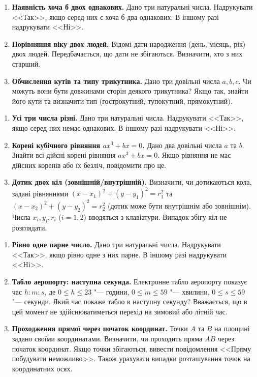 	
	
	
	{\large
		\begin{enumerate}
			\item \textbf{Наявність хоча б двох однакових.} Дано три натуральні числа. Надрукувати <<Так>>, якщо серед них є хоча б два однакових. В іншому разі надрукувати <<Ні>>.
			\item \textbf{Порівняння віку двох людей.} Відомі дати народження (день, місяць, рік) двох людей. Передбачається, що дати не збігаються. Визначити, хто з них старший.
			\item \textbf{Обчислення кутів та типу трикутника.} Дано три довільні числа $a, b, c$. Чи можуть вони бути довжинами сторін деякого трикутника? Якщо так, знайти його кути та визначити тип (гострокутний, тупокутний, прямокутний).
		\end{enumerate}
	}
	
	\vspace{2cm}
	
	{\large
		\begin{enumerate}
			\item \textbf{Усі три числа різні.} Дано три натуральні числа. Надрукувати <<Так>>, якщо серед них немає однакових. В іншому разі надрукувати <<Ні>>.
			\item \textbf{Корені кубічного рівняння $ax^3+bx=0$.} Дано два довільні числа $a$ та $b$. Знайти всі дійсні корені рівняння $ax^3 + bx = 0$. Якщо рівняння не має дійсних коренів або їх безліч, повідомити про це.
			\item \textbf{Дотик двох кіл (зовнішній/внутрішній).} Визначити, чи дотикаються кола, задані рівняннями $(x - x_1)^2 + (y - y_1)^2 = r_1^2$ та $(x - x_2)^2 + (y - y_2)^2 = r_2^2$ (дотик може бути внутрішнім або зовнішнім). Числа $x_i, y_i, r_i$ ($i = 1, 2$) вводяться з клавіатури. Випадок збігу кіл не розглядати.
		\end{enumerate}
	}
	

	
	
	{\large
		\begin{enumerate}
			\item \textbf{Рівно одне парне число.} Дано три натуральні числа. Надрукувати <<Так>>, якщо рівно одне з них парне. В іншому разі надрукувати <<Ні>>.
			\item \textbf{Табло аеропорту: наступна секунда.} Електронне табло аеропорту показує час $h:m:s$, де $0 \leqslant h \leqslant 23$ "--- години, $0 \leqslant m \leqslant 59$ "--- хвилини, $0 \leqslant s \leqslant 59$ "--- секунди. Який час покаже табло в наступну секунду? Вважається, що в цей момент не здійснюватиметься перехід на зимовий або літній час.
			\item \textbf{Проходження прямої через початок координат.} Точки $A$ та $B$ на площині задано своїми координатами. Визначити, чи проходить пряма $AB$ через початок координат. Якщо точки збігаються, вивести повідомлення <<Пряму побудувати неможливо>>. Також урахувати випадки розташування точок на координатних осях.
		\end{enumerate}
	}
	

